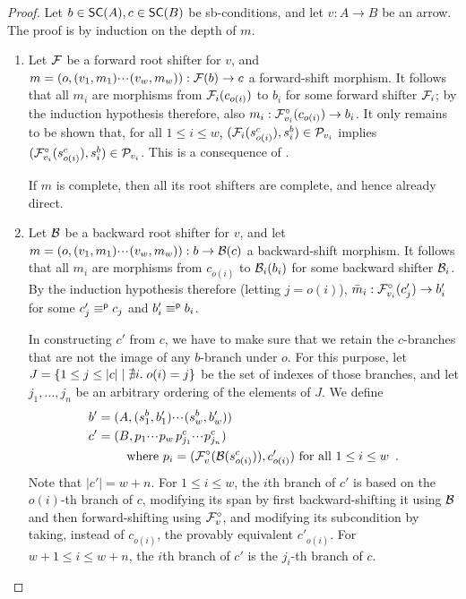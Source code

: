 \begin{proof}
Let $b\in \SC A,c\in \SC B$ be sb-conditions, and let $v:A\to B$ be an arrow. The proof is by induction on the depth of $m$.
\begin{enumerate}[topsep=\smallskipamount]
\item Let $\mathcal{F}$ be a forward root shifter for $v$, and $m=(o,(v_1,m_1){\cdotp\mkern-2mu\cdotp\mkern-2mu\cdotp\mkern1mu}(v_w,m_w)):\mathcal{F}(b)\to c$ a forward-shift morphism. It follows that all $m_i$ are morphisms from $\mathcal{F}_i(c_{o(i)})$ to $b_i$ for some forward shifter $\mathcal{F}_i$; by the induction hypothesis therefore, also $m_i:\mathcal{F}^\circ_{v_i}(c_{o(i)})\to b_i$. It only remains to be shown that, for all $1\leq i\leq w$, $(\mathcal{F}_i(s^c_{o(i)}),s^b_i)\in \mathcal{P}_{v_i}$ implies $(\mathcal{F}^\circ_{v_i}(s^c_{o(i)}),s^b_i)\in \mathcal{P}_{v_i}$. This is a consequence of .

\smallskip
If $m$ is complete, then all its root shifters are complete, and hence already direct.

\item Let $\mathcal{B}$ be a backward root shifter for $v$, and let $m=(o,(v_1,m_1){\cdotp\mkern-2mu\cdotp\mkern-2mu\cdotp\mkern1mu}(v_w,m_w)): b \to \mathcal{B}(c)$ a backward-shift morphism. It follows that all $m_i$ are morphisms from $c_{o(i)}$ to $\mathcal{B}_i(b_i)$ for some backward shifter $\mathcal{B}_i$. By the induction hypothesis therefore (letting $j=o(i)$), $\bar m_i:\mathcal{F}^\circ_{v_i}(c_j')\to b_i'$ for some $c_j'\equiv^{\mathsf p} c_j$ and $b'_i\equiv^{\mathsf p} b_i$.

\smallskip
In constructing $c'$ from $c$, we have to make sure that we retain the $c$-branches that are not the image of any $b$-branch under $o$. For this purpose, let $J=\{{1\leq j\leq |c|\mid \nexists i.\; o(i)=j}\}$ be the set of indexes of those branches, and let $j_1,\ldots,j_n$ be an arbitrary ordering of the elements of $J$. We define 
\begin{align*}
b'=\;&(A,(s^b_1,b'_1){\cdotp\mkern-2mu\cdotp\mkern-2mu\cdotp\mkern1mu} (s^b_w,b'_w)) \\
c'=\;&(B,p_1{\cdotp\mkern-2mu\cdotp\mkern-2mu\cdotp\mkern1mu} p_w\,p^c_{j_1}{\cdotp\mkern-2mu\cdotp\mkern-2mu\cdotp\mkern1mu} p^c_{j_n}) \\
   & \quad\text{where } p_i = (\mathcal{F}^\circ_{v}(\mathcal{B}(s^c_{o(i)})),c'_{o(i)}) \text{ for all $1\leq i\leq w$}\enspace.
\end{align*}
%
Note that $|c'|=w+n$. For $1\leq i\leq w$, the $i$th branch of $c'$ is based on the $o(i)$-th branch of $c$, modifying its span by first backward-shifting it using $\mathcal{B}$ and then forward-shifting using $\mathcal{F}^\circ_{v}$, and modifying its subcondition by taking, instead of $c_{o(i)}$, the provably equivalent $c'_{o(i)}$. For $w+1\leq i\leq w+n$, the $i$th branch of $c'$ is the $j_i$-th branch of $c$.


\end{enumerate}
\end{proof}
